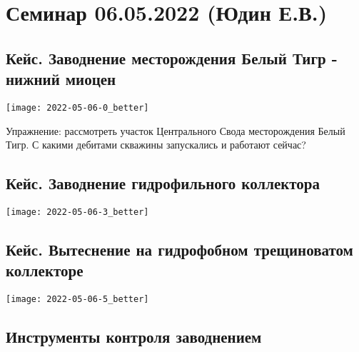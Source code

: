 \documentclass[main.tex]{subfiles}
\begin{document}
\section{Семинар 06.05.2022 (Юдин Е.В.)}

\subsection{Кейс. Заводнение месторождения Белый Тигр - нижний миоцен}

\texttt{[image: 2022-05-06-0\_better]}



Упражнение: рассмотреть участок Центрального Свода месторождения Белый Тигр. С какими дебитами скважины запускались и работают сейчас?

\subsection{Кейс. Заводнение гидрофильного коллектора}

\texttt{[image: 2022-05-06-3\_better]}


\subsection{Кейс. Вытеснение на гидрофобном трещиноватом коллекторе}

\texttt{[image: 2022-05-06-5\_better]}








\subsection{Инструменты контроля заводнением}
\end{document}
